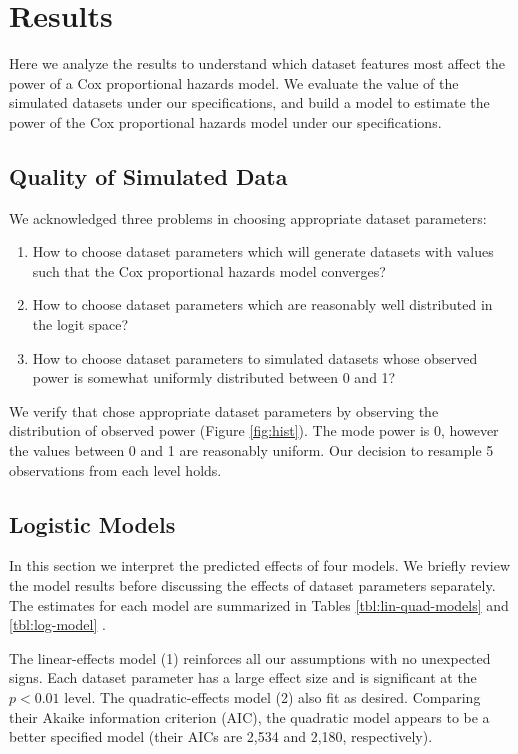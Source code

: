 \section{Results}

Here we analyze the results to understand which dataset features most affect the power of a Cox proportional hazards model. We evaluate the value of the simulated datasets under our specifications, and build a model to estimate the power of the Cox proportional hazards model under our specifications. 

\subsection{Quality of Simulated Data}

We acknowledged three problems in choosing appropriate dataset parameters:

\begin{enumerate}
    \item How to choose dataset parameters which will generate datasets with values such that the Cox proportional hazards model converges?
    \item How to choose dataset parameters which are reasonably well distributed in the logit space? 
    \item How to choose dataset parameters to simulated datasets whose observed power is somewhat uniformly distributed between 0 and 1?
\end{enumerate}



We verify that chose appropriate dataset parameters by observing the distribution of observed power (Figure \ref{fig:hist}). The mode power is 0, however the values between 0 and 1 are reasonably uniform. Our decision to resample 5 observations from each level holds. 

\subsection{Logistic Models}

In this section we interpret the predicted effects of four models. We briefly review the model results before discussing the effects of dataset parameters separately. The estimates for each model are summarized in Tables \ref{tbl:lin-quad-models} and \ref{tbl:log-model} \cite{stargazer}. 

The linear-effects model (1) reinforces all our assumptions with no unexpected signs. Each dataset parameter has a large effect size and is significant at the $p < 0.01$ level. The quadratic-effects model (2) also fit as desired. Comparing their Akaike information criterion (AIC), the quadratic model appears to be a better specified model (their AICs are 2,534 and 2,180, respectively). 

